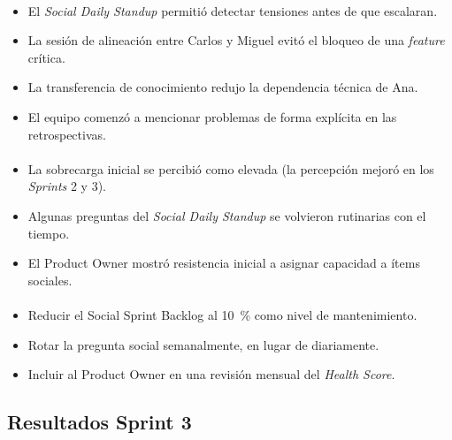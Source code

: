 \paragraph{}
\begin{itemize}
    \item El \textit{Social Daily Standup} permitió detectar tensiones antes de que escalaran.
    \item La sesión de alineación entre Carlos y Miguel evitó el bloqueo de una \textit{feature} crítica.
    \item La transferencia de conocimiento redujo la dependencia técnica de Ana.
    \item El equipo comenzó a mencionar problemas de forma explícita en las retrospectivas.
\end{itemize}

\paragraph{}
\begin{itemize}
    \item La sobrecarga inicial se percibió como elevada (la percepción mejoró en los \textit{Sprints} 2 y 3).
    \item Algunas preguntas del \textit{Social Daily Standup} se volvieron rutinarias con el tiempo.
    \item El Product Owner mostró resistencia inicial a asignar capacidad a ítems sociales.
\end{itemize}

\paragraph{}
\begin{itemize}
    \item Reducir el Social Sprint Backlog al 10~\% como nivel de mantenimiento.
    \item Rotar la pregunta social semanalmente, en lugar de diariamente.
    \item Incluir al Product Owner en una revisión mensual del \textit{Health Score}.
\end{itemize}

\subsection{Resultados Sprint 3}

